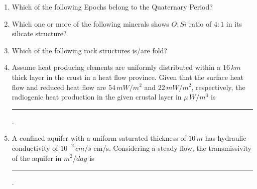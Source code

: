 \documentclass[journal,12pt,onecolumn]{IEEEtran}
\theoremstyle{remark}
\begin{document}
\begin{enumerate}
\item Which of the following Epochs belong to the Quaternary Period?
\begin{enumerate}
\end{enumerate}
\hfill{}

\item Which one or more of the following minerals shows $O\colon Si$ ratio of $4\colon1$ in its silicate structure?
\begin{enumerate}
\end{enumerate}
\hfill{}

\item Which of the following rock structures is/are fold?
\begin{enumerate}
\end{enumerate}
\hfill{}

\item Assume heat producing elements are uniformly distributed within a $16\,km$ thick layer in the crust in a heat flow province. Given that the surface heat flow and reduced heat flow are $54\,mW/m^2$ and $22\,mW/m^2$, respectively, the radiogenic heat production in the given crustal layer in $\mu\,W/m^3$ is \rule{3cm}{0.15mm} .
\hfill{}

\item A confined aquifer with a uniform saturated thickness of $10\,m$ has hydraulic conductivity of $10^{-2}\,cm/s$ cm/s. Considering a steady flow, the transmissivity of the aquifer in $m^2/day$ is \rule{3cm}{0.15mm} .
\hfill{}


\end{enumerate}
\end{document}
